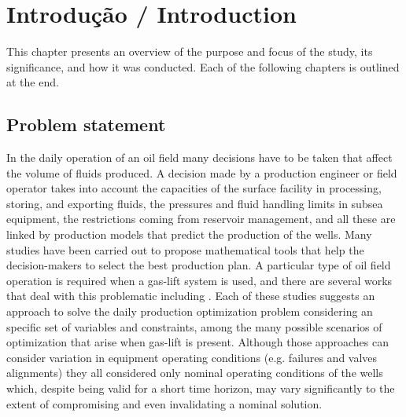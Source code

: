 
\chapter{Introdu\c{c}\~{a}o / Introduction}\label{int}
%
This chapter presents an overview of the purpose and focus of the study, its significance, and how it was conducted. Each of the following chapters is outlined at the end.

\section[Problem statement]{Problem statement\protect\footnotemark}
%
In the daily operation of an oil field many decisions have to be taken that affect the volume of fluids produced. A decision made by a production engineer or field operator takes into account the capacities of the surface facility in processing, storing, and exporting fluids, the pressures and fluid handling limits in subsea equipment, the restrictions coming from reservoir management, and all these are linked by production models that predict the production of the wells.
%
Many studies have been carried out to propose mathematical tools that help the decision-makers to select the best production plan. 
%
A particular type of oil field operation is required when a gas-lift system is used, and there are several works that deal with this problematic including \cite{Redden1974,Buitrago1996,Kosmidis2004,Campos2010,Gunnerud2010,Codas2012a,Silva2014,Lima2015}. 
%
Each of these studies suggests an approach to solve the daily production optimization problem considering an specific set of variables and constraints, among the many possible scenarios of optimization that arise when gas-lift is present.
%
Although those approaches can consider variation in equipment operating conditions (e.g. failures and valves alignments) they all considered only  nominal operating conditions of the wells which, despite being valid for a short time horizon, may vary significantly to the extent of compromising and even invalidating a nominal solution.
%

